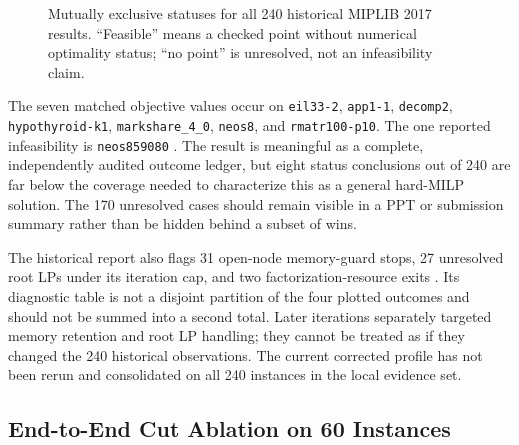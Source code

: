 \documentclass[10pt,a4paper,twocolumn]{article}
\begin{document}
\begin{figure}[t]
\centering
{}
\caption{Mutually exclusive statuses for all 240 historical MIPLIB 2017 results. ``Feasible'' means a checked point without numerical optimality status; ``no point'' is unresolved, not an infeasibility claim.}
\label{fig:mip240}
\end{figure}

The seven matched objective values occur on \texttt{eil33-2}, \texttt{app1-1}, \texttt{decomp2}, \texttt{hypothyroid-k1}, \texttt{markshare\_4\_0}, \texttt{neos8}, and \texttt{rmatr100-p10}. The one reported infeasibility is \texttt{neos859080} \cite{mip240}. The result is meaningful as a complete, independently audited outcome ledger, but eight status conclusions out of 240 are far below the coverage needed to characterize this as a general hard-MILP solution. The 170 unresolved cases should remain visible in a PPT or submission summary rather than be hidden behind a subset of wins.

The historical report also flags 31 open-node memory-guard stops, 27 unresolved root LPs under its iteration cap, and two factorization-resource exits \cite{mip240}. Its diagnostic table is not a disjoint partition of the four plotted outcomes and should not be summed into a second total. Later iterations separately targeted memory retention and root LP handling; they cannot be treated as if they changed the 240 historical observations. The current corrected profile has not been rerun and consolidated on all 240 instances in the local evidence set.

\subsection{End-to-End Cut Ablation on 60 Instances}
\end{document}
